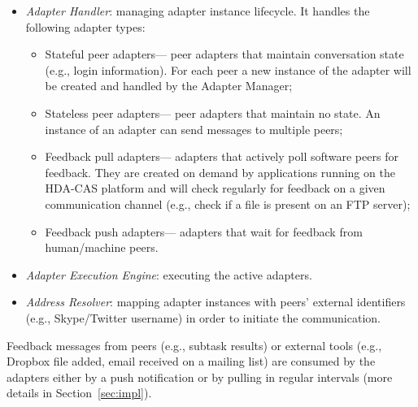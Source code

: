 \documentclass{llncs}
\begin{document}
    \begin{itemize}
      \item \emph{Adapter Handler}: managing adapter instance lifecycle. It handles the following adapter types:  
            \begin{itemize}%
              \item Stateful peer adapters--- peer adapters that maintain conversation state (e.g., login information). For each peer a new instance of the adapter will be created and handled by the Adapter Manager; 
              \item Stateless peer adapters--- peer adapters that maintain no state. An instance of an adapter can send messages to multiple peers; 
              \item Feedback pull adapters--- adapters that actively poll software peers for feedback. They are created on demand by applications running on the HDA-CAS platform and will check regularly for feedback on a given communication channel (e.g., check if a file is present on an FTP server);
              \item Feedback push adapters--- adapters that wait for feedback from human/machine peers. 
            \end{itemize}
      \item \emph{Adapter Execution Engine}: executing the active adapters.
      \item \emph{Address Resolver}: mapping adapter instances with peers' external identifiers (e.g., Skype/Twitter username) in order to initiate the communication.
    \end{itemize}


    Feedback messages from peers (e.g., subtask results) or external tools (e.g., Dropbox file added, email received on a mailing list) are consumed by the adapters either by a push notification or by pulling in regular intervals (more details in Section~\ref{sec:impl}). 
    
\end{document}
